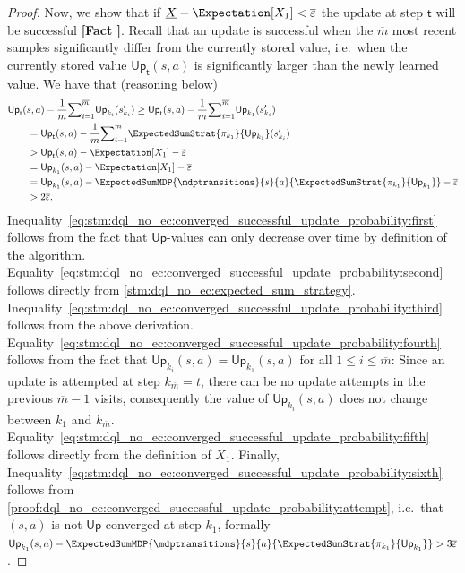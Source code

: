 \documentclass{theoretics}
\newcommand{\strategy}{\pi}
\newcommand{\upperbound}{\mathsf{Up}}
\newcommand{\updatestep}{{\overline{\varepsilon}}}
\newcommand{\delay}{{\overline{m}}}
\newcommand{\algostep}{\mathsf{t}}
\newcounter{proofref}
\newcommand{\plabel}[1]{\refstepcounter{proofref}\label{#1}\textbf{[Fact \Roman{proofref}]}}
\begin{document}
\begin{proof}
	Now, we show that if $\underline{X} - \Expectation[X_1] < \updatestep$ the update at step $\algostep$ will be successful \plabel{proof:dql_no_ec:converged_successful_update_probability:update_success}.
	Recall that an update is successful when the $\delay$ most recent samples significantly differ from the currently stored value, i.e.\ when the currently stored value $\upperbound_\algostep(s, a)$ is significantly larger than the newly learned value.
	We have that (reasoning below)
	\begin{align}
		& \upperbound_\algostep(s, a) - \frac{1}{m} {\sum}_{i=1}^\delay \upperbound_{k_i}(s_{k_i}') \geq \upperbound_\algostep(s, a) - \frac{1}{m} {\sum}_{i=1}^\delay \upperbound_{k_1}(s_{k_i}') \label{eq:stm:dql_no_ec:converged_successful_update_probability:first} \\
			& \qquad = \upperbound_\algostep(s, a) - \frac{1}{m} {\sum}_{i=1}^\delay \ExpectedSumStrat{\strategy_{k_1}}{\upperbound_{k_1}}(s_{k_i}') \label{eq:stm:dql_no_ec:converged_successful_update_probability:second} \\
			& \qquad > \upperbound_\algostep(s, a) - \Expectation[X_1] - \updatestep \label{eq:stm:dql_no_ec:converged_successful_update_probability:third} \\
			& \qquad = \upperbound_{k_1}(s, a) - \Expectation[X_1] - \updatestep \label{eq:stm:dql_no_ec:converged_successful_update_probability:fourth} \\
			& \qquad = \upperbound_{k_1}(s, a) - \ExpectedSumMDP{\mdptransitions}{s}{a}{\ExpectedSumStrat{\strategy_{k_1}}{\upperbound_{k_1}}} - \updatestep \label{eq:stm:dql_no_ec:converged_successful_update_probability:fifth} \\
			& \qquad > 2 \updatestep. \label{eq:stm:dql_no_ec:converged_successful_update_probability:sixth}
	\end{align}
	Inequality~\eqref{eq:stm:dql_no_ec:converged_successful_update_probability:first} follows from the fact that $\upperbound$-values can only decrease over time by definition of the algorithm.
	Equality~\eqref{eq:stm:dql_no_ec:converged_successful_update_probability:second} follows directly from \cref{stm:dql_no_ec:expected_sum_strategy}.
	Inequality~\eqref{eq:stm:dql_no_ec:converged_successful_update_probability:third} follows from the above derivation.
	Equality~\eqref{eq:stm:dql_no_ec:converged_successful_update_probability:fourth} follows from the fact that $\upperbound_{k_i}(s, a) = \upperbound_{k_1}(s, a)$ for all $1 \leq i \leq \delay$:
	Since an update is attempted at step $k_\delay = t$, there can be no update attempts in the previous $\delay - 1$ visits, consequently the value of $\upperbound_{k_i}(s, a)$ does not change between $k_1$ and $k_\delay$.
	Equality~\eqref{eq:stm:dql_no_ec:converged_successful_update_probability:fifth} follows directly from the definition of $X_1$.
	Finally, Inequality~\eqref{eq:stm:dql_no_ec:converged_successful_update_probability:sixth} follows from \ref{proof:dql_no_ec:converged_successful_update_probability:attempt}, i.e.\ that $(s, a)$ is not $\upperbound$-converged at step $k_1$, formally $\upperbound_{k_1}(s, a) - \ExpectedSumMDP{\mdptransitions}{s}{a}{\ExpectedSumStrat{\strategy_{k_1}}{\upperbound_{k_1}}} > 3 \updatestep$.


\end{proof}
\end{document}
